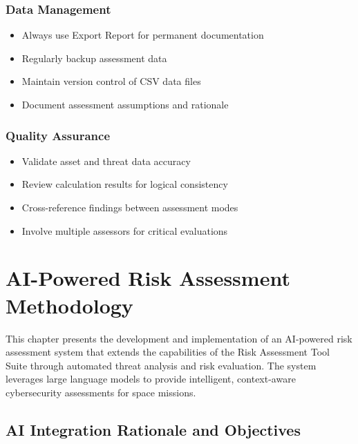 \documentclass[binding=0.6cm]{sapthesis}
\begin{document}
\subsection{Data Management}

\begin{itemize}
    \item Always use Export Report for permanent documentation
    \item Regularly backup assessment data
    \item Maintain version control of CSV data files
    \item Document assessment assumptions and rationale
\end{itemize}

\subsection{Quality Assurance}

\begin{itemize}
    \item Validate asset and threat data accuracy
    \item Review calculation results for logical consistency
    \item Cross-reference findings between assessment modes
    \item Involve multiple assessors for critical evaluations
\end{itemize}

\chapter{AI-Powered Risk Assessment Methodology}
\label{ch:ai_training}

This chapter presents the development and implementation of an AI-powered risk assessment system that extends the capabilities of the Risk Assessment Tool Suite through automated threat analysis and risk evaluation. The system leverages large language models to provide intelligent, context-aware cybersecurity assessments for space missions.

\section{AI Integration Rationale and Objectives}
\end{document}
